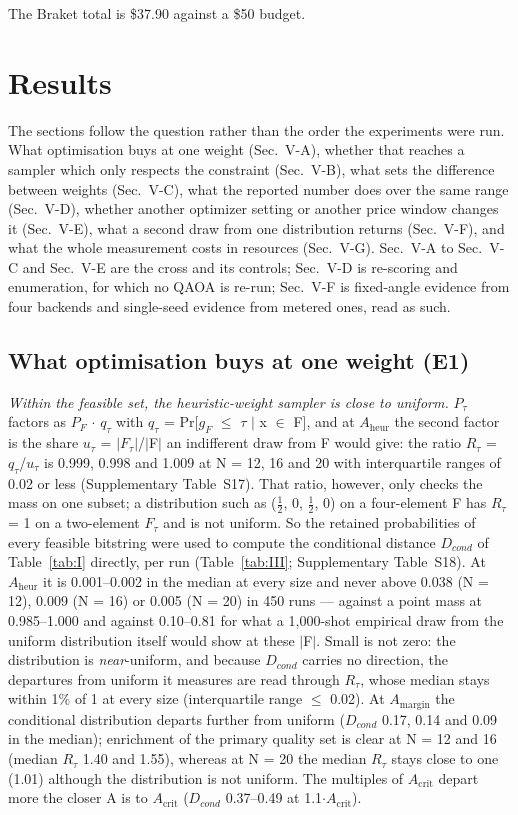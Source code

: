 \documentclass{ieeeaccess}
\begin{document}
The Braket total is \$37.90 against a \$50 budget.


\section{Results}


The sections follow the question rather than the order the experiments were run. What optimisation buys at one weight (Sec.~V-A), whether that reaches a sampler which only respects the constraint (Sec.~V-B), what sets the difference between weights (Sec.~V-C), what the reported number does over the same range (Sec.~V-D), whether another optimizer setting or another price window changes it (Sec.~V-E), what a second draw from one distribution returns (Sec.~V-F), and what the whole measurement costs in resources (Sec.~V-G). Sec.~V-A to Sec.~V-C and Sec.~V-E are the cross and its controls; Sec.~V-D is re-scoring and enumeration, for which no QAOA is re-run; Sec.~V-F is fixed-angle evidence from four backends and single-seed evidence from metered ones, read as such.


\subsection{What optimisation buys at one weight (E1)}


\textit{Within the feasible set, the heuristic-weight sampler is close to uniform.} $P_{\tau}$ factors as $P_{F}$ $\cdot$ $q_{\tau}$ with $q_{\tau}$ = Pr[$g_{F}$ $\leq$ $\tau$ $|$ x $\in$ F], and at $A_{\mathrm{heur}}$ the second factor is the share $u_{\tau}$ = $|$$F_{\tau}$$|$/$|$F$|$ an indifferent draw from F would give: the ratio $R_{\tau}$ = $q_{\tau}$/$u_{\tau}$ is 0.999, 0.998 and 1.009 at N = 12, 16 and 20 with interquartile ranges of 0.02 or less (Supplementary Table~S17). That ratio, however, only checks the mass on one subset; a distribution such as ($\tfrac{1}{2}$, 0, $\tfrac{1}{2}$, 0) on a four-element F has $R_{\tau}$ = 1 on a two-element $F_{\tau}$ and is not uniform. So the retained probabilities of every feasible bitstring were used to compute the conditional distance $D_{cond}$ of Table~\ref{tab:I} directly, per run (Table~\ref{tab:III}; Supplementary Table~S18). At $A_{\mathrm{heur}}$ it is 0.001--0.002 in the median at every size and never above 0.038 (N = 12), 0.009 (N = 16) or 0.005 (N = 20) in 450 runs --- against a point mass at 0.985--1.000 and against 0.10--0.81 for what a 1,000-shot empirical draw from the uniform distribution itself would show at these $|$F$|$. Small is not zero: the distribution is \textit{near}-uniform, and because $D_{cond}$ carries no direction, the departures from uniform it measures are read through $R_{\tau}$, whose median stays within 1\% of 1 at every size (interquartile range $\leq$ 0.02). At $A_{\mathrm{margin}}$ the conditional distribution departs further from uniform ($D_{cond}$ 0.17, 0.14 and 0.09 in the median); enrichment of the primary quality set is clear at N = 12 and 16 (median $R_{\tau}$ 1.40 and 1.55), whereas at N = 20 the median $R_{\tau}$ stays close to one (1.01) although the distribution is not uniform. The multiples of $A_{\mathrm{crit}}$ depart more the closer A is to $A_{\mathrm{crit}}$ ($D_{cond}$ 0.37--0.49 at 1.1$\cdot$$A_{\mathrm{crit}}$).
\end{document}

